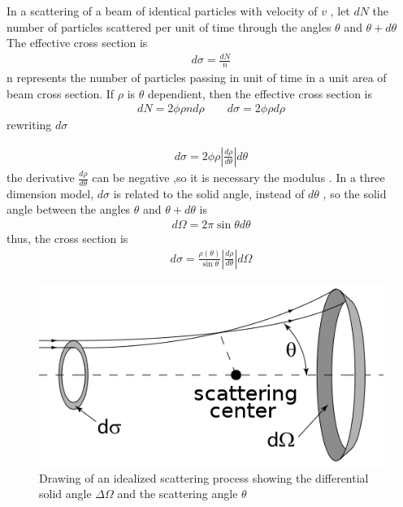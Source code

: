 In a scattering of a beam of identical particles with velocity of $v$ , let $dN$ the number of particles scattered per unit of time through the angles $\theta$ and $\theta +d\theta$
The effective cross section is 
\begin{align}
    d\sigma=\frac{dN}{n}
\end{align}
n represents the number of particles passing in unit of time in a unit area of beam cross section. If $\rho$ is $\theta$ dependient, then the effective cross section is 
\begin{align}
    dN=2\phi \rho n d\rho \qquad d\sigma=2\phi \rho d\rho
\end{align}
rewriting $d\sigma$

\begin{align}
    d\sigma=2\phi \rho \left| \frac{d\rho}{d\theta} \right| d\theta
\end{align}
the derivative $\frac{d\rho}{d\theta}$ can be negative ,so it is necessary the modulus \cite{landau}. In a three dimension model, $d\sigma$ is related to the solid angle, instead of $d\theta$ , so the solid angle between the angles $\theta$ and $\theta+d\theta$ is
\begin{align}
    d\Omega=2\pi \sin{\theta}d\theta
\end{align}
thus, the cross section is 
\begin{align}
     d\sigma=   \frac{\rho(\theta)}{\sin{\theta}} \left| \frac{d\rho}{d\theta} \right| d\Omega
\end{align}
\begin{figure}[!htbp]
\centering
\includegraphics[scale=0.7]{Chapter1/cs1.png}
 \caption{Drawing of an idealized scattering process showing the differential solid angle $\Delta\Omega$ and the
scattering angle $\theta$ \cite{gross} }
\label{sc}
\end{figure}

